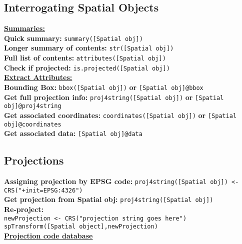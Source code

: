 \documentclass[10pt]{article}
\begin{document}
\hrulefill 
\subsection*{Interrogating Spatial Objects}
\underline{\textbf{Summaries:} }\\
\textbf{Quick summary:} \texttt{summary([Spatial obj])}\\
\textbf{Longer summary of contents:} \texttt{str([Spatial obj])}\\
\textbf{Full list of contents:} \texttt{attributes([Spatial obj])}\\
\textbf{Check if projected:} \texttt{is.projected([Spatial obj])}\\

\underline{\textbf{Extract Attributes:}}\\
\textbf{Bounding Box:} \texttt{bbox([Spatial obj])} \textbf{or} \texttt{[Spatial obj]@bbox}\\
\textbf{Get full projection info:} \texttt{proj4string([Spatial obj])} \textbf{or} \texttt{[Spatial obj]@proj4string}\\
\textbf{Get associated coordinates:} \texttt{coordinates([Spatial obj])} \textbf{or} \texttt{[Spatial obj]@coordinates}\\
\textbf{Get associated data:} \texttt{[Spatial obj]@data}\\


\hrulefill 
\subsection*{Projections}
\textbf{Assigning projection by EPSG code:} \texttt{proj4string([Spatial obj]) <-CRS("+init=EPSG:4326")}\\
\textbf{Get projection from Spatial obj:} \texttt{proj4string([Spatial obj])} \\
\textbf{Re-project:} \\
\hspace*{0.3cm}\texttt{newProjection <- CRS("projection string goes here")}\\
\hspace*{0.3cm}\texttt{spTransform([Spatial object],newProjection)}\\
\href{http://www.spatialreference.org/}{\underline{\textbf{Projection code database}}} \\


\hrulefill 
\end{document}
